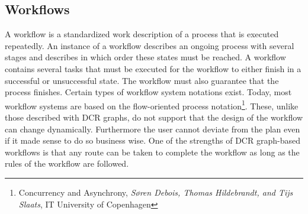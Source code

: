 \subsection{Workflows}
A workflow is a standardized work description of a process that is executed repeatedly. \newline
An instance of a workflow describes an ongoing process with several stages and describes in which order these states must be reached. A workflow contains several tasks that must be executed for the workflow to either finish in a successful or unsuccessful state. The workflow must also guarantee that the process finishes. \newline
Certain types of workflow system notations exist. Today, most workflow systems are based on the flow-oriented process notation\footnote{Concurrency and Asynchrony, \textit{Søren Debois, Thomas Hildebrandt, and Tijs Slaats}, IT University of Copenhagen}. These, unlike those described with DCR graphs, do not support that the design of the workflow can change dynamically. Furthermore the user cannot deviate from the plan even if it made sense to do so business wise. One of the strengths of DCR graph-based workflows is that any route can be taken to complete the workflow as long as the rules of the workflow are followed.